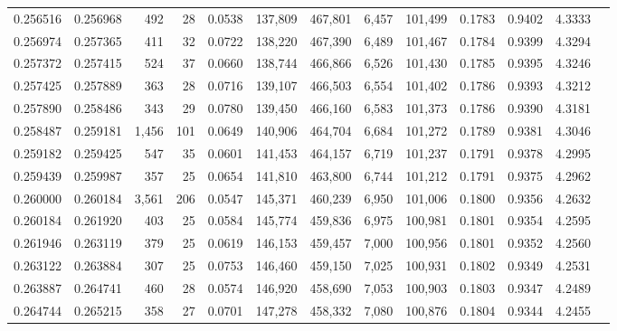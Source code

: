\begin{tabular}{rrrrrrrrrrrrr}
0.256516 & 0.256968 &   492 &  28 &                                     0.0538 & 137,809 & 467,801 &   6,457 & 101,499 & 0.1783 & 0.9402 & 4.3333 \\
0.256974 & 0.257365 &   411 &  32 &                                     0.0722 & 138,220 & 467,390 &   6,489 & 101,467 & 0.1784 & 0.9399 & 4.3294 \\
0.257372 & 0.257415 &   524 &  37 &                                     0.0660 & 138,744 & 466,866 &   6,526 & 101,430 & 0.1785 & 0.9395 & 4.3246 \\
0.257425 & 0.257889 &   363 &  28 &                                     0.0716 & 139,107 & 466,503 &   6,554 & 101,402 & 0.1786 & 0.9393 & 4.3212 \\
0.257890 & 0.258486 &   343 &  29 &                                     0.0780 & 139,450 & 466,160 &   6,583 & 101,373 & 0.1786 & 0.9390 & 4.3181 \\
0.258487 & 0.259181 & 1,456 & 101 &                                     0.0649 & 140,906 & 464,704 &   6,684 & 101,272 & 0.1789 & 0.9381 & 4.3046 \\
0.259182 & 0.259425 &   547 &  35 &                                     0.0601 & 141,453 & 464,157 &   6,719 & 101,237 & 0.1791 & 0.9378 & 4.2995 \\
0.259439 & 0.259987 &   357 &  25 &                                     0.0654 & 141,810 & 463,800 &   6,744 & 101,212 & 0.1791 & 0.9375 & 4.2962 \\
0.260000 & 0.260184 & 3,561 & 206 &                                     0.0547 & 145,371 & 460,239 &   6,950 & 101,006 & 0.1800 & 0.9356 & 4.2632 \\
0.260184 & 0.261920 &   403 &  25 &                                     0.0584 & 145,774 & 459,836 &   6,975 & 100,981 & 0.1801 & 0.9354 & 4.2595 \\
0.261946 & 0.263119 &   379 &  25 &                                     0.0619 & 146,153 & 459,457 &   7,000 & 100,956 & 0.1801 & 0.9352 & 4.2560 \\
0.263122 & 0.263884 &   307 &  25 &                                     0.0753 & 146,460 & 459,150 &   7,025 & 100,931 & 0.1802 & 0.9349 & 4.2531 \\
0.263887 & 0.264741 &   460 &  28 &                                     0.0574 & 146,920 & 458,690 &   7,053 & 100,903 & 0.1803 & 0.9347 & 4.2489 \\
0.264744 & 0.265215 &   358 &  27 &                                     0.0701 & 147,278 & 458,332 &   7,080 & 100,876 & 0.1804 & 0.9344 & 4.2455 \\

\end{tabular}
